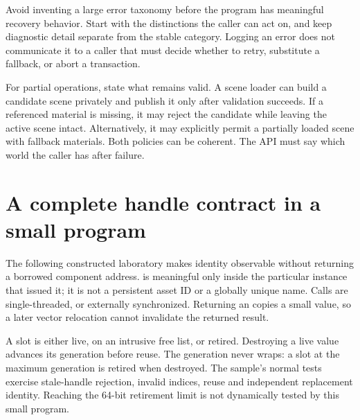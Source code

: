 Avoid inventing a large error taxonomy before the program has meaningful recovery behavior. Start with the distinctions the caller can act on, and keep diagnostic detail separate from the stable category. Logging an error does not communicate it to a caller that must decide whether to retry, substitute a fallback, or abort a transaction.

For partial operations, state what remains valid. A scene loader can build a candidate scene privately and publish it only after validation succeeds. If a referenced material is missing, it may reject the candidate while leaving the active scene intact. Alternatively, it may explicitly permit a partially loaded scene with fallback materials. Both policies can be coherent. The API must say which world the caller has after failure.

\section{A complete handle contract in a small program}\label{01-foundations-i-ch008-a-complete-handle-contract-in-a-small-program}

\hypertarget{01-foundations-i-ch008-a-complete-handle-contract-in-a-small-program}{}

The following constructed laboratory makes identity observable without returning a borrowed component address.  is meaningful only inside the particular  instance that issued it; it is not a persistent asset ID or a globally unique name. Calls are single-threaded, or externally synchronized. Returning an  copies a small value, so a later vector relocation cannot invalidate the returned result.

A slot is either live, on an intrusive free list, or retired. Destroying a live value advances its generation before reuse. The generation never wraps: a slot at the maximum generation is retired when destroyed. The sample's normal tests exercise stale-handle rejection, invalid indices, reuse and independent replacement identity. Reaching the 64-bit retirement limit is not dynamically tested by this small program.


